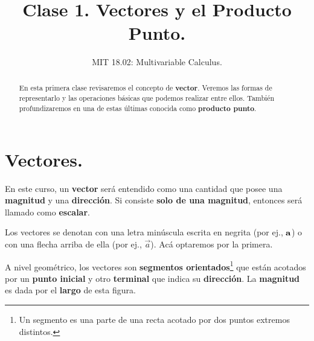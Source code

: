 \documentclass[12pt]{article}
\title{Clase 1. Vectores y el Producto Punto.}
\author{MIT 18.02: Multivariable Calculus.}
\date{}
\begin{document}


\maketitle

\begin{abstract}
\noindent En esta primera clase revisaremos el concepto de \textbf{vector}. Veremos las formas de representarlo y las operaciones básicas que podemos realizar entre ellos. También profundizaremos en una de estas últimas conocida como \textbf{producto punto}.
\end{abstract}

\section{Vectores.}

En este curso, un \textbf{vector} será entendido como una cantidad que posee una \textbf{magnitud} y una \textbf{dirección}. Si consiste \textbf{solo de una magnitud}, entonces será llamado como \textbf{escalar}.

Los vectores se denotan con una letra minúscula escrita en negrita (por ej., $\mathbf{a}$) o con una flecha arriba de ella (por ej., $\vec{a}$). Acá optaremos por la primera.

A nivel geométrico, los vectores son \textbf{segmentos orientados}\footnote{Un segmento es una parte de una recta acotado por dos puntos extremos distintos.} que están acotados por un \textbf{punto inicial} y otro \textbf{terminal} que indica su \textbf{dirección}. La \textbf{magnitud} es dada por el \textbf{largo} de esta figura.
\end{document}
